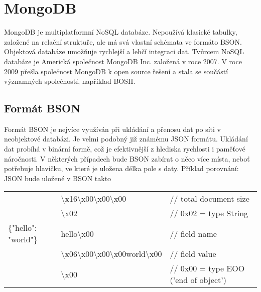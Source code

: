 \section {MongoDB}
\par MongoDB je multiplatformní NoSQL databáze. Nepoužívá klasické tabulky, založené na relační struktuře, ale má svá vlastní schémata ve formáto BSON. Objektová databáze umožňuje rychlejší a lehčí integraci dat. Tvůrcem NoSQL databáze je Americká společnost MongoDB Inc. založená v roce 2007. V roce 2009 přešla společnost MongoDB k open source řešení a stala se součástí významných společností, například BOSH.
\subsection {Formát BSON}
\par Formát BSON je nejvíce využíván při ukládání a přenosu dat po síti v neobjektové databázi. Je velmi podobný již známému JSON formátu. Ukládání dat probíhá v binární formě, což je efektivnější z hlediska rychlosti i paměťové náročnosti. V některých případech bude BSON zabírat o něco více místa, neboť potřebuje hlavičku, ve které je uložena délka pole s daty.
Příklad porovnání: JSON  bude uložené v BSON takto \newline
\begin{tabular}{ l l l }
 						& \textbackslash{x}16\textbackslash{x}00\textbackslash{x}00\textbackslash{x}00 								&// total document size \\
 						& \textbackslash{x}02 																						&// 0x02 = type String\\
\{"hello": "world"\} 	& hello\textbackslash{x}00 																					&// field name\\
 						& \textbackslash{x}06\textbackslash{x}00\textbackslash{x}00\textbackslash{x}00world\textbackslash{x}00 		&// field value\\
 						& \textbackslash{x}00 																						&// 0x00 = type EOO ('end of object')\\
\end{tabular}



                   
  
  
